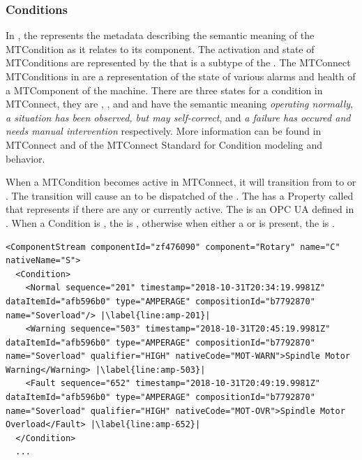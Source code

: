 \subsubsection{Conditions}\label{sec:mapping-conditions}
\lstset{language=XML,numbers=left,xleftmargin=2em}

In \cite{MTCPart2}, the  represents the metadata describing the semantic meaning of the \gls{MTCondition} as it relates to its component. The activation and state of \glspl{MTCondition} are represented by the  that is a subtype of the . The MTConnect \glspl{MTCondition} in \cite{MTCPart3} are a representation of the state of various alarms and health of a \gls{MTComponent} of the machine. There are three states for a condition in MTConnect, they are , , and  and have the semantic meaning \textit{operating normally}, \textit{a situation has been observed, but may self-correct}, and \textit{a failure has occured and needs manual intervention} respectively. More information can be found in MTConnect \cite{MTCPart2} and \cite{MTCPart3} of the MTConnect Standard for Condition modeling and behavior.

When a \gls{MTCondition} becomes active in MTConnect, it will transition from  to  or . The transition will cause an  to be dispatched of the . The  has a \gls{Property} called  that represents if there are any  or  currently active. The  is an OPC UA   defined in \cite{UAPart8}. When a Condition is , the  is , otherwise when either a  or  is present, the  is .

\begin{lstlisting}[firstnumber=last,escapechar=|,%
    caption={Rotary C Component Stream},label={lst:rotary-component-stream}]
<ComponentStream componentId="zf476090" component="Rotary" name="C" nativeName="S">
  <Condition>
    <Normal sequence="201" timestamp="2018-10-31T20:34:19.9981Z" dataItemId="afb596b0" type="AMPERAGE" compositionId="b7792870" name="Soverload"/> |\label{line:amp-201}|
    <Warning sequence="503" timestamp="2018-10-31T20:45:19.9981Z" dataItemId="afb596b0" type="AMPERAGE" compositionId="b7792870" name="Soverload" qualifier="HIGH" nativeCode="MOT-WARN">Spindle Motor Warning</Warning> |\label{line:amp-503}|
    <Fault sequence="652" timestamp="2018-10-31T20:49:19.9981Z" dataItemId="afb596b0" type="AMPERAGE" compositionId="b7792870" name="Soverload" qualifier="HIGH" nativeCode="MOT-OVR">Spindle Motor Overload</Fault> |\label{line:amp-652}|
  </Condition>
  ...
\end{lstlisting} %

